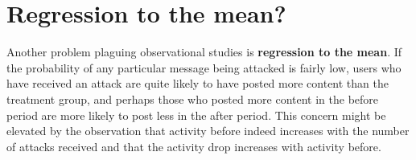 \documentclass[10pt,]{scrartcl}
\begin{document}
\section{Regression to the mean?}

Another problem plaguing observational studies is
\textbf{regression to the mean}. If the probability of any particular
message being attacked is fairly low, users who have received an attack
are quite likely to have posted more content than the treatment group,
and perhaps those who posted more content in the \textsf{before} period
are more likely to post less in the \textsf{after} period. This concern
might be elevated by the observation that activity before indeed
increases with the number of attacks received and that the activity drop
increases with \textsf{activity} before.

\footnotesize
\end{document}
